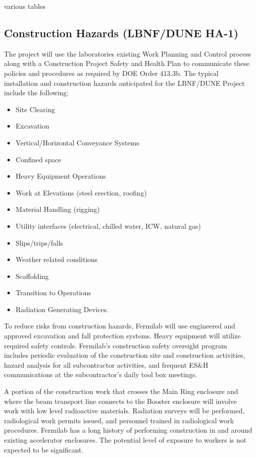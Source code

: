 various tables

\subsection{Construction Hazards (LBNF/DUNE HA-1)}

The project will use the laboratories existing Work Planning and
Control process along with a Construction Project Safety and Health
Plan to communicate these policies and procedures as required by DOE
Order 413.3b. The typical installation and construction hazards
anticipated for the LBNF/DUNE Project include the following:
\begin{itemize}
 \item Site Clearing
 \item Excavation
 \item Vertical/Horizontal Conveyance Systems
 \item Confined space
 \item Heavy Equipment Operations
 \item Work at Elevations (steel erection, roofing)
 \item Material Handling (rigging)
 \item Utility interfaces (electrical, chilled water, ICW, natural gas)
 \item Slips/trips/falls
 \item Weather related conditions
 \item Scaffolding
 \item Transition to Operations
 \item Radiation Generating Devices.
\end{itemize}

To reduce risks from construction hazards, Fermilab will use
engineered and approved excavation and fall protection systems.  Heavy
equipment will utilize required safety controls. Fermilab’s
construction safety oversight program includes periodic evaluation of
the construction site and construction activities, hazard analysis for
all subcontractor activities, and frequent ES\&H communications at the
subcontractor’s daily tool box meetings.

A portion of the construction work that crosses the Main Ring
enclosure and where the beam transport line connects to the Booster
enclosure will involve work with low level radioactive
materials. Radiation surveys will be performed, radiological work
permits issued, and personnel trained in radiological work
procedures. Fermilab has a long history of performing construction in
and around existing accelerator enclosures. The potential level of
exposure to workers is not expected to be significant.

